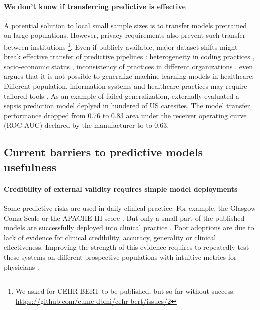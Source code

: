 \documentclass[french,12pt,twoside,a4paper]{book}
\newlength{\drop}%
\begin{document}
\paragraph{We don't know if transferring predictive is effective} A potential
solution to local small sample sizes is to transfer models pretrained on large
populations. However, privacy requirements also prevent such transfer
between institutions \footnote{We asked for CEHR-BERT to be published, but so
  far without success: \url{https://github.com/cumc-dbmi/cehr-bert/issues/2}}.
Even if publicly available, major dataset shifts might break effective transfer
of predictive pipelines \citep{finlayson2021clinician}: heterogeneity in coding
practices \citep{juven2013codage}, socio-economic status
\citep{gianfrancesco2018potential}, inconsistency of practices in different
organizations \citep{agniel2018biases}.
\cite{futoma2020myth} even argues that it is not possible to generalize machine
learning models in healthcare: Different population, information systems and
healthcare practices may require tailored tools \citep{rose2018}. As an example
of failed generalization, \cite{wong2021external} externally evaluated a sepsis
prediction model deplyed in hundered of US caresites. The model transfer
performance dropped from 0.76 to 0.83 area under the receiver operating curve
(ROC AUC) declared by the manufacturer to to 0.63.

\subsection{Current barriers to predictive models usefulness}%
\label{subsec:predictive_models:useful}%

\paragraph{Credibility of external validity requires simple model deployments}

Some predictive risks are used in daily clinical practice: For example, the
Glasgow Coma Scale \citep{teasdale1974assessment} or the APACHE III score
\citep{knaus1991apache}. But only a small part of the published models are
successfully deployed into clinical practice \citep{wyatt1995commentary,
  kelly2019key}. Poor adoptions are due to lack of evidence for clinical
credibility, accuracy, generality or clinical effectiveness. Improving the
strength of this evidence requires to repeatedly test these systems on
different prospective populations with intuitive metrics for physicians
\citep{kelly2019key, varoquaux2022evaluating, wornow2023shaky}.
\end{document}
